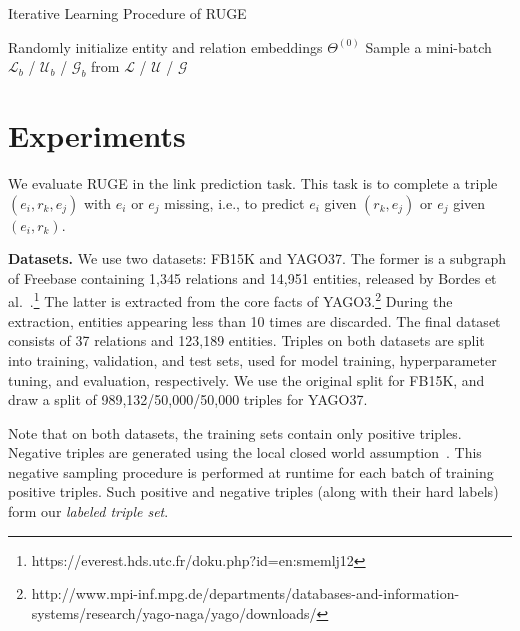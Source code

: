 \documentclass[letterpaper]{article} \usepackage{aaai18}  \usepackage{times}  \usepackage{helvet}  \usepackage{courier}  \usepackage{url}  \usepackage{graphicx}  \usepackage{amsmath}
\begin{document}
\begin{algorithm}[t]
\small
\caption{Iterative Learning Procedure of RUGE}\label{alg:RUGE}
\begin{algorithmic}[1]
\STATE Randomly initialize entity and relation embeddings $\Theta^{(0)}$
    \STATE Sample a mini-batch $\mathcal{L}_b$ / $\mathcal{U}_b$ / $\mathcal{G}_b$ from $\mathcal{L}$ / $\mathcal{U}$ / $\mathcal{G}$
\ENDFOR
{}
\end{algorithmic}
\end{algorithm}

\section{Experiments}
We evaluate RUGE in the link prediction task. This task is to complete a triple $(e_i, r_k, e_j)$ with $e_i$ or $e_j$ missing, i.e., to predict $e_i$ given $(r_k, e_j)$ or $e_j$ given $(e_i, r_k)$.

\smallskip
\noindent\textbf{Datasets.} We use two datasets: FB15K and YAGO37. The former is a subgraph of Freebase containing 1,345 relations and 14,951 entities, released by Bordes et al.~.\footnote{https://everest.hds.utc.fr/doku.php?id=en:smemlj12} The latter is extracted from the core facts of YAGO3.\footnote{http://www.mpi-inf.mpg.de/departments/databases-and-information-systems/research/yago-naga/yago/downloads/} During the extraction, entities appearing less than 10 times are discarded. The final dataset consists of 37 relations and 123,189 entities. Triples on both datasets are split into training, validation, and test sets, used for model training, hyperparameter tuning, and evaluation, respectively. We use the original split for FB15K, and draw a split of 989,132/50,000/50,000 triples for YAGO37.

Note that on both datasets, the training sets contain only positive triples. Negative triples are generated using the local closed world assumption~\cite{dong2014:KnowledgeVault}. This negative sampling procedure is performed at runtime for each batch of training positive triples. Such positive and negative triples (along with their hard labels) form our \textit{labeled triple set}.
\end{document}
